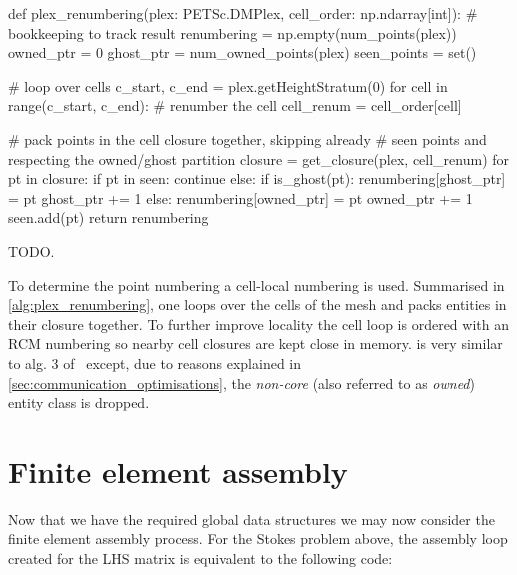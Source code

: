\documentclass[thesis]{subfiles}
\begin{document}
\begin{algorithm}
  \begin{center}
    \begin{minipage}{.9\textwidth}
      \begin{pyalg2}
        def plex_renumbering(plex: PETSc.DMPlex, cell_order: np.ndarray[int]):
          # bookkeeping to track result
          renumbering = np.empty(num_points(plex))
          owned_ptr = 0
          ghost_ptr = num_owned_points(plex)
          seen_points = set()

          # loop over cells
          c_start, c_end = plex.getHeightStratum(0)
          for cell in range(c_start, c_end):
            # renumber the cell
            cell_renum = cell_order[cell]

            # pack points in the cell closure together, skipping already
            # seen points and respecting the owned/ghost partition
            closure = get_closure(plex, cell_renum)
            for pt in closure:
              if pt in seen:
                continue
              else:
                if is_ghost(pt):
                  renumbering[ghost_ptr] = pt
                  ghost_ptr += 1
                else:
                  renumbering[owned_ptr] = pt
                  owned_ptr += 1
                seen.add(pt)
        return renumbering
      \end{pyalg2}
    \end{minipage}
  \end{center}

  \caption{
    TODO.
  }
  \label{alg:plex_renumbering}
\end{algorithm}

To determine the point numbering a cell-local numbering is used.
Summarised in \cref{alg:plex_renumbering}, one loops over the cells of the mesh and packs entities in their closure together.
To further improve locality the cell loop is ordered with an RCM numbering so nearby cell closures are kept close in memory.
 is very similar to alg. 3 of~\cite{langeEfficientMeshManagement2016} except, due to reasons explained in \cref{sec:communication_optimisations}, the \textit{non-core} (also referred to as \textit{owned}) entity class is dropped.

\section{Finite element assembly}

Now that we have the required global data structures we may now consider the finite element assembly process.
For the Stokes problem above, the assembly loop created for the LHS matrix is equivalent to the following  code:
\end{document}
